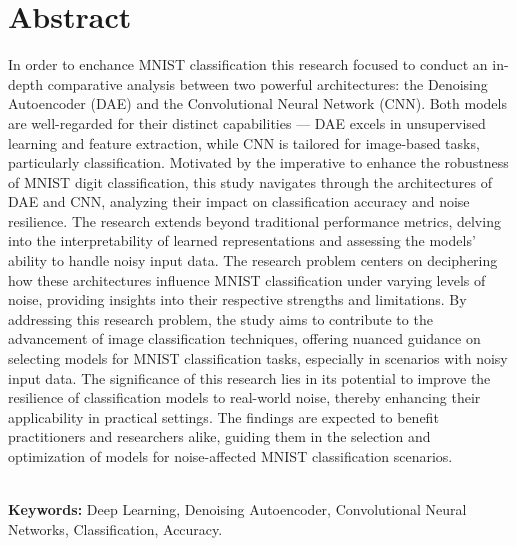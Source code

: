 \chapter*{\center \Large  Abstract}

In order to enchance MNIST classification this research focused to conduct an in-depth 
comparative analysis between two powerful architectures: the Denoising Autoencoder (DAE) and 
the Convolutional Neural Network (CNN). Both models are well-regarded for their distinct 
capabilities — DAE excels in unsupervised learning and feature extraction, while CNN is 
tailored for image-based tasks, particularly  classification. Motivated by the imperative to 
enhance the robustness of MNIST digit classification, this study navigates through the 
architectures of DAE and CNN, analyzing their impact on classification accuracy and noise 
resilience. The research extends beyond traditional performance metrics, delving into the 
interpretability of learned representations and assessing the models' ability to handle noisy 
input data. The research problem centers on deciphering how these architectures influence MNIST 
classification under varying levels of noise, providing insights into their respective 
strengths and limitations.  By addressing this research problem, the study aims to contribute 
to the advancement of image classification techniques, offering nuanced guidance on selecting 
models for MNIST classification tasks, especially in scenarios with noisy input data. The 
significance of this research lies in its potential to improve the resilience of classification 
models to real-world noise, thereby enhancing their applicability in practical settings. The 
findings are expected to benefit practitioners and researchers alike, guiding them in the 
selection and optimization of models for noise-affected MNIST classification scenarios.


~\\[1cm]
\noindent %
\textbf{Keywords:} Deep Learning, Denoising Autoencoder,
Convolutional Neural Networks, Classification, Accuracy.